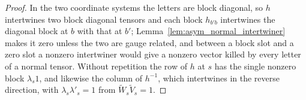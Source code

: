 \begin{proof}
    \leanok
    In the two coordinate systems the letters are block diagonal, so $h$ intertwines two block
    diagonal tensors and each block $h_{b'b}$ intertwines the diagonal block at $b$ with that at
    $b'$; Lemma~\ref{lem:asym_normal_intertwiner} makes it zero unless the two are gauge related,
    and between a block slot and a zero slot a nonzero intertwiner would give a nonzero vector
    killed by every letter of a normal tensor. Without repetition the row of $h$ at $s$ has the
    single nonzero block $\lambda_s1$, and likewise the column of $h^{-1}$, which intertwines in the
    reverse direction, with $\lambda_s\lambda'_s=1$ from $\widetilde W_s\widetilde V_s=1$.
\end{proof}
